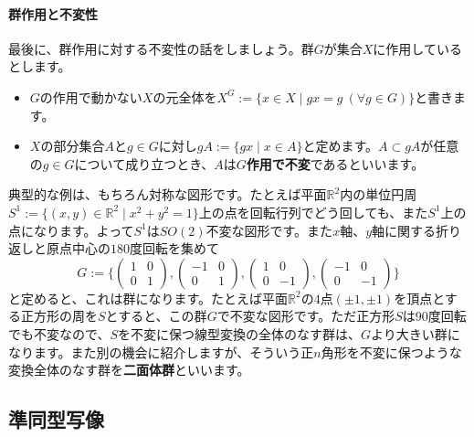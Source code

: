 \paragraph{群作用と不変性}

最後に、群作用に対する不変性の話をしましょう。群$G$が集合$X$に作用しているとします。
\begin{itemize}
\item $G$の作用で動かない$X$の元全体を$X^G := \{x \in X \mid gx = g \ (\forall g \in G)\}$と書きます。
\item $X$の部分集合$A$と$g \in G$に対し$gA := \{gx \mid x \in A\}$と定めます。$A \subset gA$が任意の$g \in G$について成り立つとき、$A$は\textbf{$G$作用で不変}であるといいます。
\end{itemize}

典型的な例は、もちろん対称な図形です。たとえば平面$\mathbb{R}^2$内の単位円周$S^1 := \{(x, y) \in \mathbb{R}^2 \mid x^2 + y^2 = 1\}$上の点を回転行列でどう回しても、また$S^1$上の点になります。よって$S^1$は$SO(2)$不変な図形です。また$x$軸、$y$軸に関する折り返しと原点中心の$180$度回転を集めて
\[
G := \biggl\{
\begin{pmatrix}
1 & 0 \\
0 & 1
\end{pmatrix}, 
\begin{pmatrix}
-1 & 0 \\
0 & 1
\end{pmatrix}, 
\begin{pmatrix}
1 & 0 \\
0 & -1
\end{pmatrix}, 
\begin{pmatrix}
-1 & 0 \\
0 & -1
\end{pmatrix}
\biggr\}
\]
と定めると、これは群になります。たとえば平面$\mathbb{R}^2$の$4$点$(\pm1, \pm1)$を頂点とする正方形の周を$S$とすると、この群$G$で不変な図形です。ただ正方形$S$は$90$度回転でも不変なので、$S$を不変に保つ線型変換の全体のなす群は、$G$より大きい群になります。また別の機会に紹介しますが、そういう正$n$角形を不変に保つような変換全体のなす群を\textbf{二面体群}といいます。

\subsection{準同型写像}

